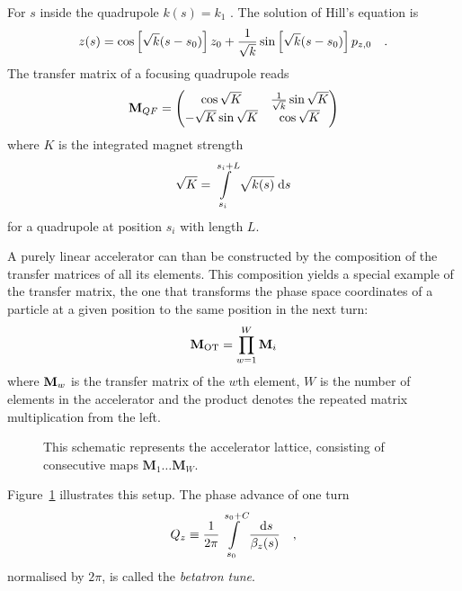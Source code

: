 For $s$ inside the quadrupole $k(s) = k_1$ . The solution of Hill's equation is
%
\begin{equation}
    z(s) = \cos \left[ \sqrt{k}(s-s_0)\right] z_0 +
        \frac{1}{\sqrt{k}}\sin\left[\sqrt{k}(s-s_0)\right]p_{z,0}
    \label{eq_quad_transfer}
    \quad .
\end{equation}
%
The transfer matrix of a focusing quadrupole reads
%
\begin{equation}
    \mathbf{M}_{QF} =
    \begin{pmatrix}
        \cos \sqrt{K} & \frac{1}{\sqrt{k}} \sin \sqrt{K} \\
        -\sqrt{K}\sin \sqrt{K} & \cos \sqrt{K}
    \end{pmatrix}
    \label{eq_trmat_quad}
\end{equation}
%
where $K$ is the integrated magnet strength
%
\begin{equation}
    \sqrt{K} = \int\limits_{s_i}^{s_i + L} \sqrt{k(s)}\;\text{d} s
\end{equation}
%
for a quadrupole at position $s_i$ with length $L$.

A purely linear accelerator can than be constructed by the composition of the transfer matrices of 
all its elements. This composition yields a special example of the transfer matrix, the one that
transforms the phase space coordinates of a particle at a given position to the same position in the
next turn:
%
\begin{equation}
    \mathbf{M}_\text{OT} = \prod\limits_{w=1}^W \mathbf{M}_i
\end{equation}
%
where $\mathbf{M}_w$ is the transfer matrix of the $w$th element, $W$ is the number of elements in the
accelerator and the product denotes the repeated matrix multiplication from the left.
\begin{figure}
    \centering
    
    \caption{This schematic represents the accelerator lattice, consisting of consecutive maps
    $\mathbf{M}_1 \ldots \mathbf{M}_W$.
    }
    \label{fig_lattice}
\end{figure}
%
Figure~\ref{fig_lattice} illustrates this setup.
The phase advance of one turn
%
\begin{equation}
    Q_z \equiv \frac{1}{2\pi}\int\limits_{s_0}^{s_0+C} \frac{\;\text{d} s}{\beta_z(s)}
    \quad ,
\end{equation}
%
normalised by $2\pi$, is called the \emph{betatron tune}.

